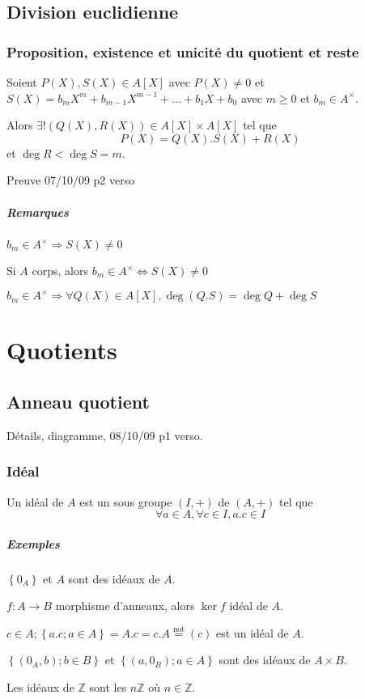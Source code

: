 \documentclass[reqno,a4paper,10pt]{report}
\makeatletter
\newcommand{\set}[1]{\left\lbrace #1 \right\rbrace} %
\newcommand{\IZ}{\ensuremath{\mathbb{Z}}\xspace} %
\newcommand{\so}{\Rightarrow}
\let\olditemize=\itemize%
\renewenvironment{itemize}{%
    \olditemize%
  }{%
    \@noparlisttrue%
    \endlist%
  }%
\makeatother
\begin{document}
\section{Division euclidienne}
\subsection{Proposition, existence et unicité du quotient et reste}
Soient $P(X), S(X) \in A[X]$ avec $P(X) \neq 0$ et $S(X)=b_m X^m +
b_{m-1} X^{m-1} + \dots + b_1 X + b_0$ avec $m\geq 0$ et $b_m \in A^\times$.

Alors $\exists! (Q(X), R(X)) \in A[X] \times A[X]$ tel que
\[P(X) = Q(X) . S(X) + R(X)\]
et $\deg R < \deg S = m$.

  Preuve 07/10/09 p2 verso

\paragraph{Remarques}
\begin{itemize}
  \item $b_m \in A^\times \so S(X) \neq 0$
  \item Si $A$ corps, alors $b_m \in A^\times \iff S(X)\neq 0$
  \item $b_m \in A^\times \so \forall Q(X) \in A[X], \deg(Q.S) = \deg Q + \deg
    S$
\end{itemize}

\chapter{Quotients}
\section{Anneau quotient}
  Détails, diagramme, 08/10/09 p1 verso.
\subsection{Idéal}
Un idéal de $A$ est un sous groupe $(I,+)$ de $(A,+)$ tel que
\[\forall a \in A, \forall c\in I, a.c \in I\]
\paragraph{Exemples}
\begin{itemize}
  \item $\set{0_A}$ et $A$ sont des idéaux de $A$.
  \item $f:A\to B$ morphisme d'anneaux, alors $\ker f$ idéal de $A$.
  \item $c\in A; \set{a.c; a\in A} = A.c = c.A \overset{\text{not}}{=}(c)$ est
    un idéal de $A$.
  \item $\set{(0_A, b); b \in B}$ et $\set{(a,0_B); a \in A}$ sont des idéaux
    de $A\times B$.
  \item Les idéaux de $\IZ$ sont les $n\IZ$ où $n\in \IZ$.
\end{itemize}
\end{document}
